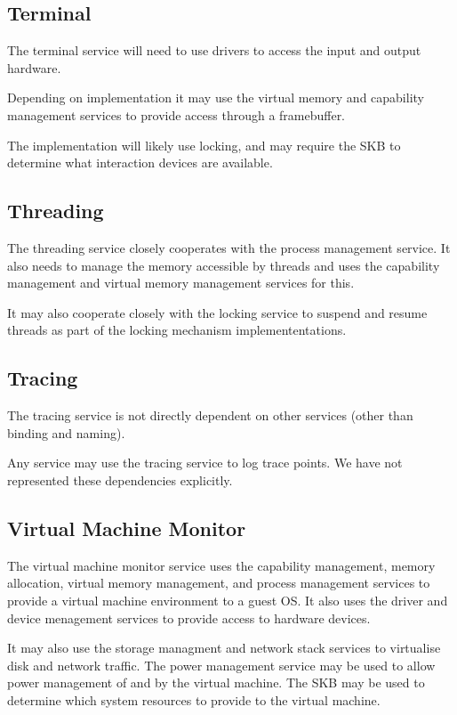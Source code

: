 \documentclass[a4paper,twoside]{report} %
\begin{document}
\subsection{Terminal}

The terminal service will need to use drivers to access the input and
output hardware.

Depending on implementation it may use the virtual memory and
capability management services to provide access through a
framebuffer.

The implementation will likely use locking, and may require the SKB to
determine what interaction devices are available.

\subsection{Threading}

The threading service closely cooperates with the process management
service.  
It also needs to manage the memory accessible by threads and
uses the capability management and virtual memory management services
for this.

It may also cooperate closely with the locking service to suspend and
resume threads as part of the locking mechanism implemententations.

\subsection{Tracing}

The tracing service is not directly dependent on other services (other
than binding and naming).

Any service may use the tracing service to log trace points.  We have
not represented these dependencies explicitly.

\subsection{Virtual Machine Monitor}

The virtual machine monitor service uses the capability management,
memory allocation, virtual memory management, and process management
services to provide a virtual machine environment to a guest OS.  It
also uses the driver and device menagement services to provide access
to  hardware devices. 

It may also use the storage managment and network stack services to
virtualise disk and network traffic. The power management service may
be used to allow power management of and by the virtual machine.  
The SKB may be used to determine which system resources to provide to
the virtual machine.
\end{document}
